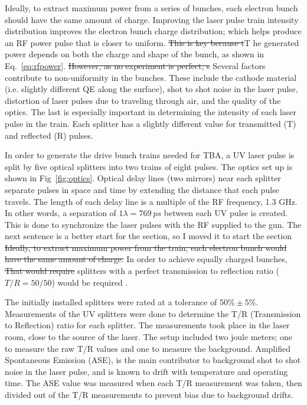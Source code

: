 \documentclass{iitthesis}
\newcommand{\lsnote}[1]{\textsf{{\color{violet}{ LS note:}   #1 }}}
\begin{document}
\lsnote{Ideally, to extract maximum power from a series of bunches, each electron bunch should have the same amount of charge.  Improving the laser pulse train intensity distribution improves the electron bunch charge distribution;} which  helps produce an RF power pulse that is closer to uniform. \lsnote{\sout{This is key because t}T}he generated power depends on both the charge and shape of the bunch, as shown in Eq.~\ref{eq:rfpower}. \lsnote{ \sout{However, as no experiment is perfect, s}}Several factors contribute to non-uniformity in the bunches. These include the cathode material
(i.e. slightly different QE along the surface), shot to shot noise in the laser pulse, 
distortion \lsnote{of laser pulses} due to traveling through air, and the quality of the optics. The last is especially important in determining the intensity of each laser pulse in the train.  
Each splitter has a slightly different value for transmitted (T) and reflected (R) pulses. 

In order to generate the drive bunch trains needed for TBA, a UV laser pulse is split 
by five optical splitters into two trains of eight pulses. 
The optics set up is shown in Fig~\ref{fig:optics}. Optical delay lines (two mirrors) near each splitter 
separate pulses in space and time by extending the distance that each pulse travels. 
The length of each delay line is a multiple of the RF frequency, 1.3 GHz. 
In other words, a separation of $1\lambda=\SI{769}{ps}$ between each UV pulse is created. 
This is done to synchronize the laser pulses with the RF supplied to the gun.
\lsnote{The next sentence is a better start for the section, so I moved it to start the section \sout{Ideally, to extract maximum power from the train, each electron bunch would have the same amount of charge.} In order to achieve equally charged bunches, \sout{ That would require}} splitters with a perfect transmission to reflection ratio ($T/R = 50/50$) \lsnote{would be required}.

The initially installed splitters were rated at a tolerance of $50\%\pm5\%$.
Measurements of the UV splitters were done to determine the T/R (Transmission to Reflection) ratio for 
each splitter. The measurements took place in the laser room, close to the source of the laser.
The setup included two joule meters; one to measure the raw T/R values and one to measure 
the background. Amplified Spontaneous Emission (ASE), 
is the main contributor to background shot to shot noise in the laser pulse,
and is known to drift with temperature and operating time. 
The ASE value was measured when each T/R measurement was taken, then divided out of the T/R 
measurements to prevent bias due to background drifts. 
\end{document}
